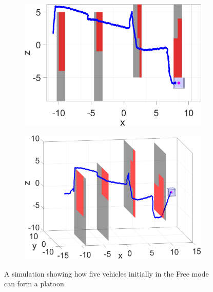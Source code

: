 \begin{figure}
  \begin{subfigure}[t]{0.4\columnwidth} \label{subfig:sim_3}
    \includegraphics[width=\columnwidth]{fig/1042}
    \caption{}
  \end{subfigure}
  \begin{subfigure}[t]{0.4\columnwidth} \label{subfig:sim_4}
    \includegraphics[width=\columnwidth]{fig/1173}
    \caption{}
  \end{subfigure}
  \caption{A simulation showing how five vehicles initially in the Free mode can form a platoon. \label{fig:sim}}
\end{figure}
